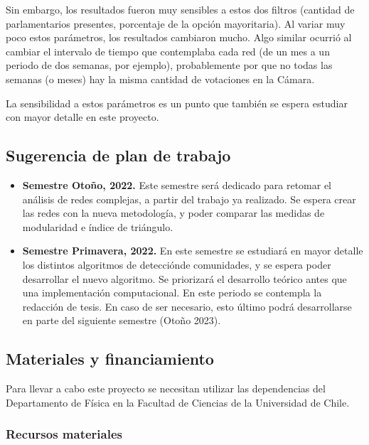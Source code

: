 \documentclass{proyectotesis}
\begin{document}
Sin embargo, los resultados fueron muy sensibles a estos dos filtros (cantidad de parlamentarios presentes, porcentaje de la opción mayoritaria). Al variar muy poco estos parámetros, los resultados cambiaron mucho. Algo similar ocurrió al cambiar el intervalo de tiempo que contemplaba cada red (de un mes a un periodo de dos semanas, por ejemplo), probablemente por que no todas las semanas (o meses) hay la misma cantidad de votaciones en la Cámara. 

La sensibilidad a estos parámetros es un punto que también se espera estudiar con mayor detalle en este proyecto. 



\subsection{Sugerencia de plan de trabajo}
\begin{itemize}
\item \textbf{Semestre Otoño, 2022.} Este semestre será dedicado para retomar el análisis de redes complejas, a partir del trabajo ya realizado. Se espera crear las redes con la nueva metodología, y poder comparar las medidas de modularidad e índice de triángulo.

\item \textbf{Semestre Primavera, 2022.} En este semestre se estudiará en mayor detalle los distintos algoritmos de detecciónde comunidades, y se espera poder desarrollar el nuevo algoritmo. Se priorizará el desarrollo teórico antes que una implementación computacional.
En este periodo se contempla la redacción de tesis. En caso de ser necesario, esto último podrá desarrollarse en parte del siguiente semestre (Otoño 2023). 
\end{itemize}

\subsection{Materiales y financiamiento}

Para llevar a cabo este proyecto se necesitan utilizar las dependencias del Departamento de Física en la Facultad de Ciencias de la Universidad de Chile. %

\subsubsection*{Recursos materiales}
\end{document}
